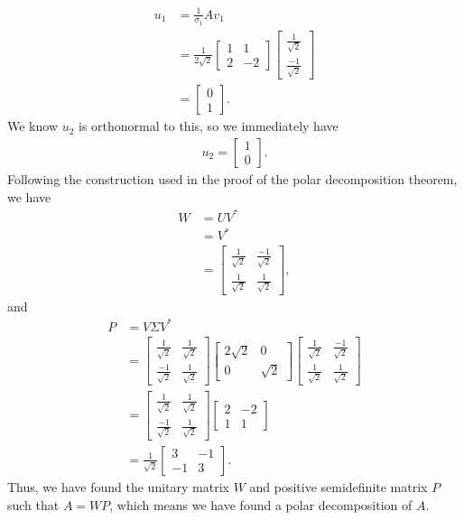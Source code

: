 \documentclass[10pt,a4paper]{article}
\theoremstyle{definition}
\begin{document}
\begin{align*}
u_1 &= \frac{1}{\sigma_1} A v_1\\
&= \frac{1}{2\sqrt{2}} \begin{bmatrix}
1 & 1\\
2 & -2
\end{bmatrix} \begin{bmatrix}
\frac{1}{\sqrt{2}}\\
\frac{-1}{\sqrt{2}}
\end{bmatrix}\\
&= \begin{bmatrix}
0\\
1
\end{bmatrix}.
\end{align*}
We know $u_2$ is orthonormal to this, so we immediately have
\begin{align*}
u_2 = \begin{bmatrix}
1\\
0
\end{bmatrix}.
\end{align*}
Following the construction used in the proof of the polar decomposition theorem, we have
\begin{align*}
W &= UV^*\\
&= V^*\\
&= \begin{bmatrix}
\frac{1}{\sqrt{2}} & \frac{-1}{\sqrt{2}}\\
\frac{1}{\sqrt{2}} & \frac{1}{\sqrt{2}}
\end{bmatrix},
\end{align*}
and
\begin{align*}
P &= V \Sigma V^*\\
&= \begin{bmatrix}
\frac{1}{\sqrt{2}} & \frac{1}{\sqrt{2}}\\
\frac{-1}{\sqrt{2}} & \frac{1}{\sqrt{2}}
\end{bmatrix} \begin{bmatrix}
2\sqrt{2} & 0\\
0 & \sqrt{2}
\end{bmatrix} \begin{bmatrix}
\frac{1}{\sqrt{2}} & \frac{-1}{\sqrt{2}}\\
\frac{1}{\sqrt{2}} & \frac{1}{\sqrt{2}}
\end{bmatrix}\\
&= \begin{bmatrix}
\frac{1}{\sqrt{2}} & \frac{1}{\sqrt{2}}\\
\frac{-1}{\sqrt{2}} & \frac{1}{\sqrt{2}}
\end{bmatrix} \begin{bmatrix}
2 & -2\\
1 & 1
\end{bmatrix}\\
&= \frac{1}{\sqrt{2}} \begin{bmatrix}
3 & -1\\
-1 & 3
\end{bmatrix}.
\end{align*}
Thus, we have found the unitary matrix $W$ and positive semidefinite matrix $P$ such that $A = WP$, which means we have found a polar decomposition of $A$.
\end{document}
